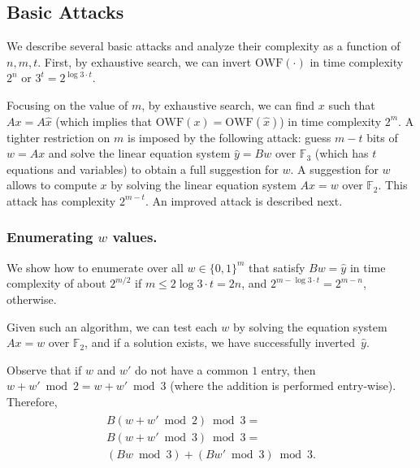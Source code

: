 \documentclass[orivec,envcountsect]{llncs}
\newcommand{\OWF}{\text{OWF}}
\begin{document}
\subsection{Basic Attacks}
\label{sec:basic}

We describe several basic attacks and analyze their complexity as a function of $n,m,t$.
First, by exhaustive search, we can invert $\OWF(\cdot)$ in time complexity $2^n$ or $3^t = 2^{\log 3 \cdot t}$.

Focusing on the value of $m$, by exhaustive search, we can find $x$ such that $Ax = A\hat{x}$ (which implies that $\OWF(x) = \OWF(\hat{x})$) in time complexity $2^m$.
A tighter restriction on $m$ is imposed by the following attack: guess $m - t$ bits of $w = Ax$ and solve the linear equation system $\hat{y} = Bw$ over $\mathbb{F}_3$ (which has $t$ equations and variables) to obtain a full suggestion for $w$. A suggestion for $w$ allows to compute $x$ by solving the linear equation system $Ax=w$ over $\mathbb{F}_2$. This attack has complexity $2^{m-t}$. An improved attack is described next.

\subsubsection{Enumerating $w$ values.}

We show how to enumerate over all $w \in \{0,1\}^m$ that satisfy $B w = \hat{y}$ in time complexity of about $2^{m/2}$ if $m \leq 2 \log 3 \cdot t = 2 n$, and $2^{m - \log 3 \cdot t} = 2^{m - n}$, otherwise.

Given such an algorithm, we can test each $w$ by solving the equation system $Ax = w$ over $\mathbb{F}_2$, and if a solution exists, we have successfully inverted~$\hat{y}$.

Observe that if $w$ and $w'$ do not have a common $1$ entry, then $w + w' \bmod 2 = w + w' \bmod 3$
(where the addition is performed entry-wise). Therefore,
\begin{align}
\label{eq:lineara}
\begin{split}
B(w + w' \bmod 2) \bmod 3 = \\
B(w + w' \bmod 3) \bmod 3 = \\
(Bw \bmod 3) + (Bw' \bmod 3) \bmod 3.
\end{split}
\end{align}
\end{document}
